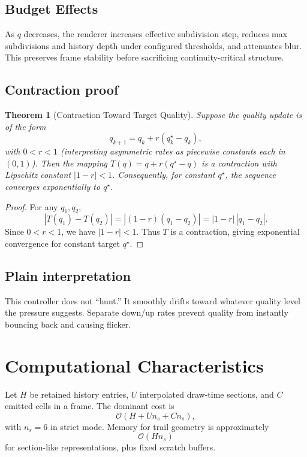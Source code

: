 \documentclass[journal]{IEEEtran}
\newtheorem{theorem}{Theorem}
\begin{document}
\subsection{Budget Effects}
As \(q\) decreases, the renderer increases effective subdivision step, reduces max subdivisions and history depth under configured thresholds, and attenuates blur. This preserves frame stability before sacrificing continuity-critical structure.

\subsection{Contraction proof}

\begin{theorem}[Contraction Toward Target Quality]
Suppose the quality update is of the form
\[
q_{k+1} = q_k + r (q_k^\star - q_k),
\]
with \(0<r<1\) (interpreting asymmetric rates as piecewise constants each in \((0,1)\)). Then the mapping \(T(q)=q+r(q^\star-q)\) is a contraction with Lipschitz constant \(|1-r|<1\). Consequently, for constant \(q^\star\), the sequence converges exponentially to \(q^\star\).
\end{theorem}

\begin{proof}
For any \(q_1,q_2\),
\[
|T(q_1)-T(q_2)| = |(1-r)(q_1-q_2)| = |1-r|\,|q_1-q_2|.
\]
Since \(0<r<1\), we have \(|1-r|<1\). Thus \(T\) is a contraction, giving exponential convergence for constant target \(q^\star\).
\end{proof}

\subsection{Plain interpretation}
This controller does not ``hunt.'' It smoothly drifts toward whatever quality level the pressure suggests. Separate down/up rates prevent quality from instantly bouncing back and causing flicker.

\section{Computational Characteristics}

Let \(H\) be retained history entries, \(U\) interpolated draw-time sections, and \(C\) emitted cells in a frame. The dominant cost is
\begin{equation}
\mathcal{O}(H + U n_s + C n_s),
\end{equation}
with \(n_s=6\) in strict mode. Memory for trail geometry is approximately
\begin{equation}
\mathcal{O}(H n_s)
\end{equation}
for section-like representations, plus fixed scratch buffers.
\end{document}
